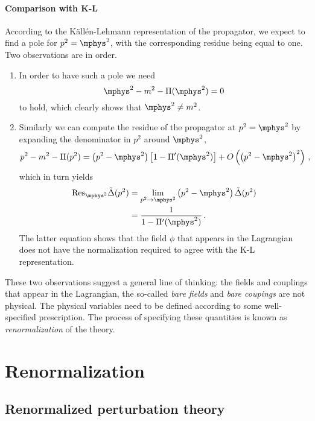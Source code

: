 \paragraph{Comparison with K-L}

According to the Källén-Lehmann representation of the propagator, we
expect to find a pole for $p^2=\mphys^2$, with the corresponding
residue being equal to one. Two observations are in order.
\begin{enumerate}
\item 
  In order to have such a pole we need
  \begin{equation}
    \label{eq:MphysPole}
    \mphys^2 - m^2 - \Pi(\mphys^2) = 0
  \end{equation}
  to hold, which clearly shows that $\mphys^2\neq m^2$.
\item
  Similarly we can
  compute the residue of the propagator at $p^2=\mphys^2$ by expanding
  the denominator in $p^2$ around $\mphys^2$,
  \begin{equation}
    \label{eq:ResDenExp}
    p^2-m^2-\Pi(p^2) =
    \left(p^2 - \mphys^2\right) \left[1 - \Pi'(\mphys^2)\right] +
    O\left(\left(p^2 - \mphys^2\right)^2\right)\, ,
  \end{equation}
  which in turn yields
  \begin{align}
    \mathrm{Res}_{\mphys^2} \tDelta(p^2)
    &= \lim_{p^2\to\mphys^2} \left(p^2 - \mphys^2\right) \tDelta(p^2) \\
    &= \frac{1}{1 - \Pi'(\mphys^2)}\, .
  \end{align}
  The latter equation shows that the field $\phi$ that appears in the
  Lagrangian does not have the normalization required to agree with the
  K-L representation.
\end{enumerate}
These two observations suggest a general line of thinking: the fields
and couplings that appear in the Lagrangian, the so-called {\em bare
  fields} and {\em bare coupings} are not physical. The physical
variables need to be defined according to some well-specified
prescription. The process of specifying these quantities is known as
{\em renormalization} of the theory.

\section{Renormalization}
\label{sec:renormalization}

\subsection{Renormalized perturbation theory}
\label{sec:renorm-pert-theory}

